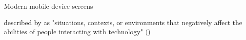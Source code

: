 
%









\cite{xuesheng2018research} Modern mobile device screens 


described by \citeauthor{yesiladaweb} as "situations, contexts, or environments that negatively affect the abilities of people interacting with technology" (\citeyear{yesiladaweb})\\

